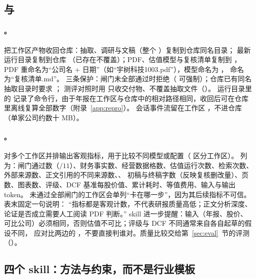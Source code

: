 \subsection{ 与 }
\label{sec:pipe-collect}

\paragraph{。}把工作区产物收回仓库：抽取、调研与文稿（整个 ）复制到仓库同名目录；
最新运行目录复制到仓库 （已存在不覆盖）；PDF、估值模型与复核清单复制到 ，
PDF 重命名为“公司名 + 日期”（如“宇树科技1003.pdf”），模型命名为 ， 命名为“复核清单.md”。
三条保护：闸门未全部通过时拒绝（ 可强制）；仓库已有同名抽取目录时要求 ；
测评对照时用  只收交付物、不覆盖抽取文件（）。
运行目录里的  记录了命令行，由于年报在工作区与仓库中的相对路径相同，收回后可在仓库里离线复算全部数字（附录~\ref{app:repro}）。
会话事件流留在工作区 ，不进仓库（单家公司约数十 MB）。

\paragraph{。}对多个工作区并排输出客观指标，用于比较不同模型或配置（ 区分工作区）。
列为：闸门通过数（$/11$）、财务事实数、经营数据格数、估值运行次数、检索次数、外部来源数、正文引用的不同来源数、、
初稿与终稿字数（反映复核删改量）、页数、图表数、评级、DCF 基准每股价值、累计耗时、等值费用、输入与输出 token。
未通过全部闸门的工作区会单列“卡在哪一步”，因为其后续指标不可信。表末固定一句说明：
“指标都是客观计数，不代表研报质量高低；正文分析深度、论证是否成立需要人工阅读 PDF 判断。”
 skill 进一步提醒：输入（年报、股价、可比公司）必须相同，否则估值不可比；评级与 DCF 不同通常来自各自起草的假设不同，
应对比两边的 ，不要直接判谁对。质量比较交给第~\ref{sec:eval}~节的评测（）。

\subsection{四个 skill：方法与约束，而不是行业模板}
\label{sec:pipe-skills}

